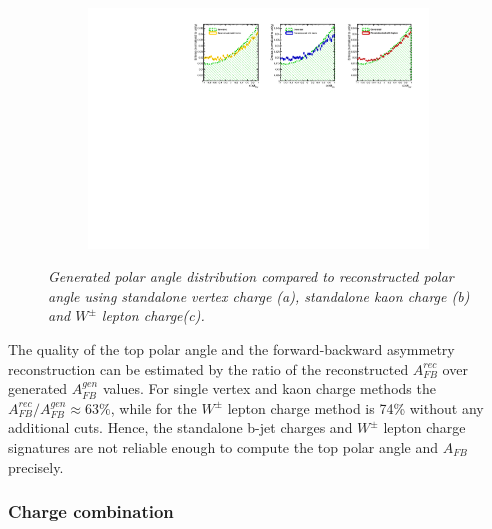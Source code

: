 \begin{figure}[H]
\begin{subfigure}{0.33\textwidth}
		\includegraphics[clip, trim=13.6cm 0cm 0.4cm 0.cm,width=0.99\textwidth]{ILD/plots/one-charge.pdf}
		\caption{\label{fig:OneCharge_c_3} }
	\end{subfigure}
	\caption{\sl Generated polar angle distribution compared to reconstructed polar angle using standalone vertex charge (a), standalone kaon charge (b) and $W^\pm$ lepton charge(c). }
	
	\label{fig:OneCharge_3}
\end{figure}

The quality of the top polar angle and the forward-backward asymmetry reconstruction can be estimated by the ratio of the reconstructed $A_{FB}^{rec}$ over generated $A^{gen}_{FB}$ values.
For single vertex and kaon charge methods the $A_{FB}^{rec}/A^{gen}_{FB} \approx 63\%$, while for the $W^\pm$ lepton charge method is 74\% without any additional cuts. 
Hence, the standalone b-jet charges and $W^\pm$ lepton charge signatures are not reliable enough to compute the top polar angle and $A_{FB}$ precisely. 
\subsubsection{Charge combination}

